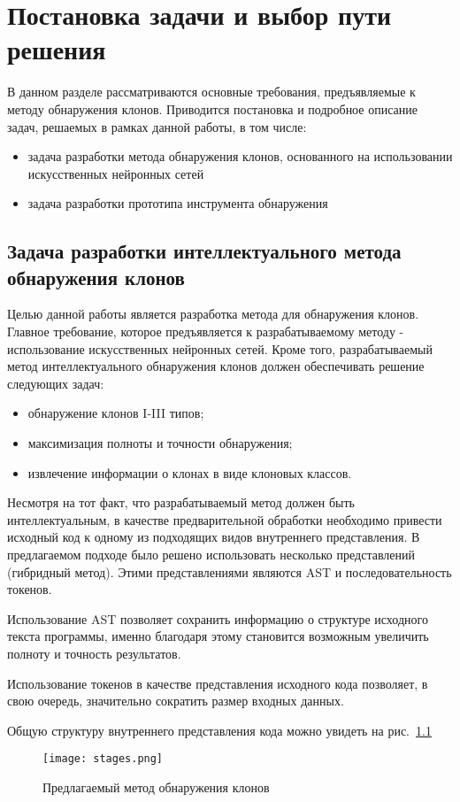 \chapter{Постановка задачи и выбор пути решения}

В данном разделе рассматриваются основные требования, предъявляемые к методу обнаружения клонов. Приводится постановка и подробное описание задач, решаемых в рамках данной работы, в том числе:
\begin{itemize}
\setlength\itemsep{0mm}
\item задача разработки метода обнаружения клонов, основанного на использовании искусственных нейронных сетей
\item задача разработки прототипа инструмента обнаружения
\end{itemize}
\section{Задача разработки интеллектуального метода обнаружения клонов}

Целью данной работы является разработка метода для обнаружения клонов. Главное требование, которое предъявляется к разрабатываемому методу - использование искусственных нейронных сетей. Кроме того, разрабатываемый метод интеллектуального обнаружения клонов должен обеспечивать решение следующих задач:
\begin{itemize}
\setlength\itemsep{0mm}
\item обнаружение клонов I-III типов;
\item максимизация полноты и точности обнаружения;
\item извлечение информации о клонах в виде клоновых классов.
\end{itemize}

Несмотря на тот факт, что разрабатываемый метод должен быть интеллектуальным, в качестве предварительной обработки необходимо привести исходный код к одному из подходящих видов внутреннего представления. В предлагаемом подходе было решено использовать несколько представлений (гибридный метод). Этими представлениями являются AST и последовательность токенов. 

Использование AST позволяет сохранить информацию о структуре исходного текста программы, именно благодаря этому становится возможным увеличить полноту и точность результатов.

Использование токенов в качестве представления исходного кода позволяет, в свою очередь, значительно сократить размер входных данных.

Общую структуру внутреннего представления кода можно увидеть на рис.~\ref{fig:stages}

\begin{figure}[htbp]
\centering
\texttt{[image: stages.png]}
\caption{Предлагаемый метод обнаружения клонов}
\label{fig:stages}
\end{figure}

